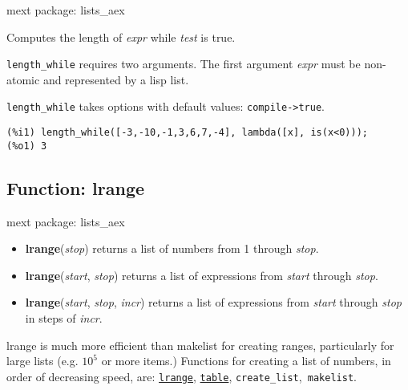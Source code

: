 \documentclass[]{article}
\begin{document}
\noindent mext package: lists\_aex



\vspace{5 pt}
Computes the length of {\it expr} while {\it test} is true. 

\vspace{5 pt}

   {\tt length\_while} requires two arguments.
    The first argument {\it expr} must be non-atomic and represented by a lisp list.


\vspace{5 pt}

{\tt length\_while} takes options with default values: {\tt compile->true}.
\vspace{5 pt}


\begin{Verbatim}[frame=single]
(%i1) length_while([-3,-10,-1,3,6,7,-4], lambda([x], is(x<0)));
(%o1) 3
\end{Verbatim}


\subsection{Function: lrange\label{sec:lrange}}
\hypertarget{lrange}{}


\noindent mext package: lists\_aex



\vspace{5 pt}
\begin{itemize}
\item[] {\bf lrange}({\it stop})
  returns a list of numbers from 1 through {\it stop}. 

\item[] {\bf lrange}({\it start}, {\it stop})
  returns a list of expressions from {\it start} through {\it stop}. 

\item[] {\bf lrange}({\it start}, {\it stop}, {\it incr})
  returns a list of expressions from {\it start} through {\it stop} in steps of {\it incr}. 

\end{itemize}
lrange is much more efficient than makelist for creating ranges, particularly for large lists (e.g. $10^5$ or more items.) Functions for creating a list of numbers, in order of decreasing speed, are: \hyperlink{lrange}{{\tt lrange}}, \hyperlink{table}{{\tt table}}, {\tt create\_list},{\tt 
makelist}. 
\end{document}
